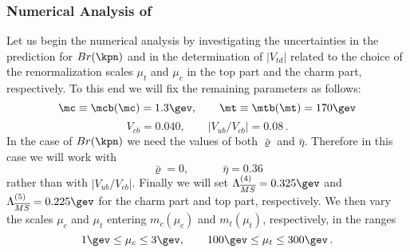 \subsubsection{Numerical Analysis of \kpnn}
\label{sec:Kpnn:NumericalKp}
Let us begin the numerical analysis by  investigating the uncertainties 
in the prediction for $Br(\kpn)$ and in the determination of  $|V_{td}|$
related to the choice of the renormalization scales $\mu_t$
and $\mu_c$ in the top part and the charm part, respectively. To this end we
will fix the remaining parameters as follows:
\begin{equation}\label{mcmtnum}
\mc\equiv \mcb(\mc)=1.3\gev, \qquad \mt\equiv \mtb(\mt)=170\gev
\end{equation}
\begin{equation}\label{vcbubnum}
V_{cb}=0.040, \qquad |V_{ub}/V_{cb}|=0.08\,.
\end{equation}
In the case of $Br(\kpn)$ we need the values of both $\bar\varrho$
and $\bar\eta$. Therefore in this case we will work with
\begin{equation}\label{rhetnum}
\bar\varrho=0, \qquad\quad  \bar\eta=0.36
\end{equation}
rather than with $|V_{ub}/V_{cb}|$. Finally we will set
$\Lambda_{\overline{MS}}^{(4)}=0.325\gev$ and
$\Lambda_{\overline{MS}}^{(5)}=0.225\gev$ for the charm part and top
part, respectively.
We then vary the scales $\mu_c$ and $\mu_t$ entering $m_c(\mu_c)$
and $m_t(\mu_t)$, respectively, in the ranges
\begin{equation}\label{muctnum}
1\gev\leq\mu_c\leq 3\gev, \qquad 100\gev\leq\mu_t\leq 300\gev\,.
\end{equation}

